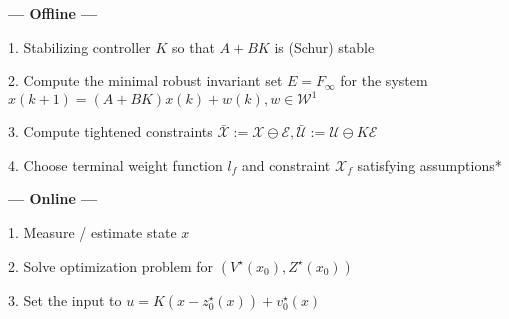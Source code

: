 \textbf{— Offline —}

1. Stabilizing controller $K$
so that $A + BK$ is (Schur) stable

2. Compute the minimal robust invariant set
$E = F_\infty$ for the system
$x(k+1) = (A + BK)x(k) + w(k), w \in \mathcal{W}^1$

3. Compute tightened constraints
$\bar{\mathcal{X}} := \mathcal{X} \ominus \mathcal{E},
	\bar{\mathcal{U}} := \mathcal{U} \ominus K\mathcal{E}$

4. Choose terminal weight function $l_f$
and constraint $\mathcal{X}_f$
satisfying assumptions* %

\textbf{— Online —}

1. Measure / estimate state $x$

2. Solve optimization problem for
$(V^\star(x_0),Z^\star(x_0))$

3. Set the input to
$u	=	K(x-z_0^\star(x))+v_0^\star(x)$
